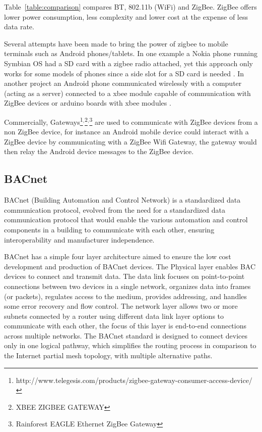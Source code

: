  Table~\ref{table:comparison} compares \ac{BT}, 802.11b (\ac{WiFi}) and ZigBee. ZigBee \cite{article:zigbee_survey} offers lower power consumption, less complexity and lower cost at the expense of less data rate.

Several attempts have been made to bring the power of zigbee to mobile terminals such as Android phones/tablets. In one example a Nokia phone running Symbian OS had a SD card with a zigbee radio attached, yet this approach only works for some models of phones since a side slot for a SD card is needed \cite{Sensing_Platform}.
In another project an Android phone communicated wirelessly with a computer (acting as a server) connected to a xbee module capable of communication with ZigBee devices or arduino boards with xbee modules \cite{article:zigbee_android}.

Commercially, Gateways\footnote{http://www.telegesis.com/products/zigbee-gateway-consumer-access-device/}$^{,}$\footnote{XBEE ZIGBEE GATEWAY}$^{,}$\footnote{Rainforest EAGLE Ethernet ZigBee Gateway} are used to communicate with ZigBee devices from a non ZigBee device, for instance an Android mobile device could interact with a ZigBee device by communicating with a ZigBee Wifi Gateway, the gateway would then relay the Android device messages to the ZigBee device.


\subsection{BACnet}


BACnet (Building Automation and Control Network) \cite{livro_automation,bacnet:artigo1,bacnet:bib,livro_automation2} is a standardized data communication protocol, evolved from the need for a standardized data communication protocol that would enable the various automation and control components in a building to communicate with each other, ensuring interoperability and manufacturer independence.

BACnet has a simple four layer architecture aimed to ensure the low cost development and production of BACnet devices. The Physical layer enables BAC devices to connect and transmit data. The data link focuses on point-to-point connections between two devices in a single network, organizes data into frames (or packets), regulates access to the medium, provides addressing, and handles some error recovery and flow control.
The network layer allows two or more subnets connected by a router using different data link layer options to communicate with each other, the focus of this layer is end-to-end connections across multiple networks. The BACnet standard is designed to connect devices only in one logical pathway, which simplifies the routing process in comparison to the Internet partial mesh topology, with multiple alternative paths.

